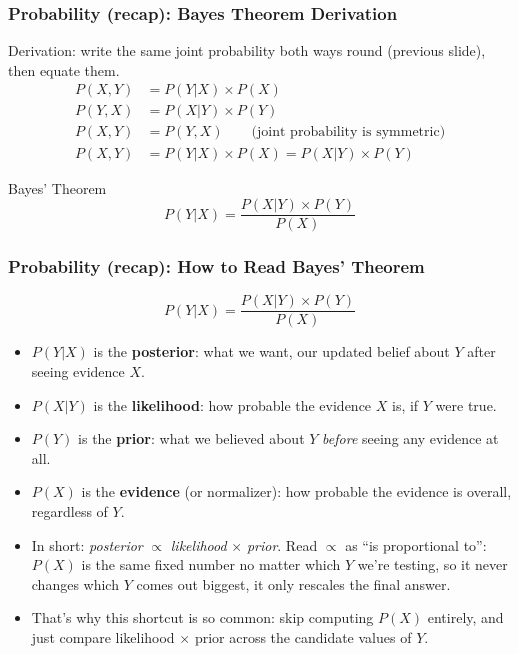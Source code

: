 \begin{frame}[fragile]\frametitle{Probability (recap): Bayes Theorem Derivation}
Derivation: write the same joint probability both ways round (previous slide), then equate them.
\begin{align*}
P(X,Y) &= P(Y|X)\times P(X)\\
P(Y,X) &= P(X|Y)\times P(Y)\\
P(X,Y) &= P(Y,X) \qquad \text{(joint probability is symmetric)}\\
P(X,Y) &= P(Y|X)\times P(X) = P(X|Y)\times P(Y)
\end{align*}
\begin{block}{Bayes' Theorem}
\[
P(Y|X) = \frac{P(X|Y)\times P(Y)}{P(X)}
\]
\end{block}
\end{frame}

\begin{frame}[fragile]\frametitle{Probability (recap): How to Read Bayes' Theorem}
\[
P(Y|X) = \frac{P(X|Y)\times P(Y)}{P(X)}
\]
\begin{itemize}
\item $P(Y|X)$ is the \textbf{posterior}: what we want, our updated belief about $Y$ after seeing evidence $X$.
\item $P(X|Y)$ is the \textbf{likelihood}: how probable the evidence $X$ is, if $Y$ were true.
\item $P(Y)$ is the \textbf{prior}: what we believed about $Y$ \emph{before} seeing any evidence at all.
\item $P(X)$ is the \textbf{evidence} (or normalizer): how probable the evidence is overall, regardless of $Y$.
\item In short: \emph{posterior} $\propto$ \emph{likelihood} $\times$ \emph{prior}. Read $\propto$ as ``is proportional to'': $P(X)$ is the same fixed number no matter which $Y$ we're testing, so it never changes which $Y$ comes out biggest, it only rescales the final answer.
\item That's why this shortcut is so common: skip computing $P(X)$ entirely, and just compare likelihood $\times$ prior across the candidate values of $Y$.
\end{itemize}
\end{frame}

